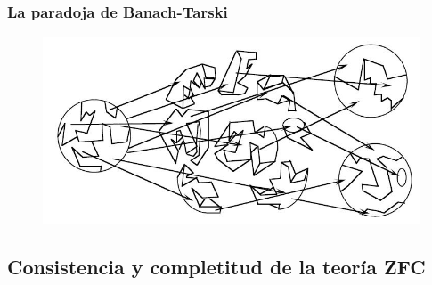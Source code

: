 \begin{frame}
 \frametitle{La paradoja de Banach-Tarski}
 
 \begin{figure}
\includegraphics[width=1.\linewidth]{IMGS/tarski}
\end{figure}
\end{frame}

\subsection{Consistencia y completitud de la teoría ZFC}

